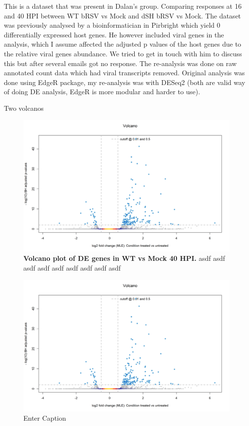 This is a dataset that was present in Dalan’s group. Comparing responses at 16 and 40 HPI between WT bRSV vs Mock and dSH bRSV vs Mock. The dataset was previously analysed by a bioinformatician in Pirbright which yield 0 differentially expressed host genes. He however included viral genes in the analysis, which I assume affected the adjusted p values of the host genes due to the relative viral genes abundance. We tried to get in touch with him to discuss this but after several emails got no response. The re-analysis was done on raw annotated count data which had viral transcripts removed. Original analysis was done using EdgeR package, my re-analysis was with DESeq2 (both are valid way of doing DE analysis, EdgeR is more modular and harder to use).

Two volcanos

\begin{figure}
    \centering
    \includegraphics[width=1\linewidth]{07. Chapter 2//Figs/14. rnaseq volcano.png}
    \caption[Volcano plot of DE genes in WT vs Mock 40 HPI.]{\textbf{Volcano plot of DE genes in WT vs Mock 40 HPI.} asdf asdf asdf asdf asdf asdf asdf asdf asdf }
    \label{Volcano plot of DE genes in WT vs Mock 40 HPI}
\end{figure}

\begin{figure}
    \centering
    \includegraphics[width=1\linewidth]{07. Chapter 2//Figs/14. rnaseq volcano.png}
    \caption{Enter Caption}
    \label{fig:enter-label}
\end{figure}